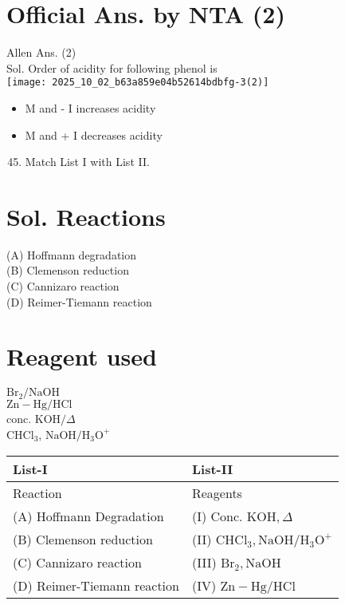 \documentclass[10pt]{article}
\begin{document}
\section*{Official Ans. by NTA (2)}
Allen Ans. (2)\\
Sol. Order of acidity for following phenol is\\
\texttt{[image: 2025\_10\_02\_b63a859e04b52614bdbfg-3(2)]}

\begin{itemize}
  \item M and - I increases acidity
\end{itemize}

\begin{itemize}
  \item M and + I decreases acidity
\end{itemize}

\begin{enumerate}
  \setcounter{enumi}{44}
  \item Match List I with List II.
\end{enumerate}

\section*{Sol. Reactions}
(A) Hoffmann degradation\\
(B) Clemenson reduction\\
(C) Cannizaro reaction\\
(D) Reimer-Tiemann reaction

\section*{Reagent used}
\(\mathrm{Br}_{2} / \mathrm{NaOH}\)\\
\(\mathrm{Zn}-\mathrm{Hg} / \mathrm{HCl}\)\\
conc. \(\mathrm{KOH} / \Delta\)\\
\(\mathrm{CHCl}_{3}\), \(\mathrm{NaOH} / \mathrm{H}_{3} \mathrm{O}^{+}\)

\begin{center}
\begin{tabular}{|l|l|}
\hline
List-I & List-II \\
\hline
Reaction & Reagents \\
\hline
(A) Hoffmann Degradation & (I) Conc. \(\mathrm{KOH}, \Delta\) \\
\hline
(B) Clemenson reduction & (II) \(\mathrm{CHCl}_{3}, \mathrm{NaOH} / \mathrm{H}_{3} \mathrm{O}^{+}\) \\
\hline
(C) Cannizaro reaction & (III) \(\mathrm{Br}_{2}, \mathrm{NaOH}\) \\
\hline
(D) Reimer-Tiemann reaction & (IV) \(\mathrm{Zn}-\mathrm{Hg} / \mathrm{HCl}\) \\
\hline
\end{tabular}
\end{center}
\end{document}
